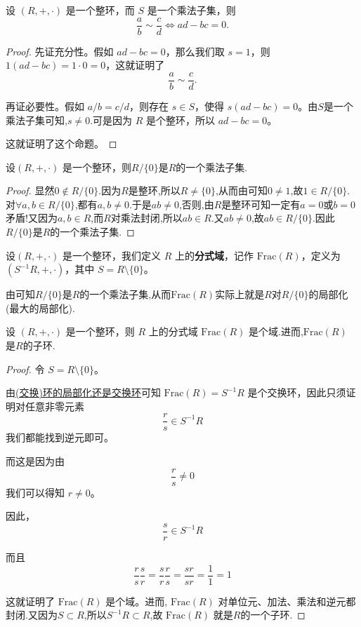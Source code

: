 \documentclass[../../main.tex]{subfiles}
\begin{document}
\begin{proposition}\label{proposition整环的局部化中两个元素等价的充要条件}
设 $(R, +, \cdot)$ 是一个整环，而 $S$ 是一个乘法子集，则
\[\frac{a}{b} \sim \frac{c}{d} \iff ad - bc = 0 .\]
\end{proposition}
\begin{proof}
先证充分性。假如 $ad - bc = 0$，那么我们取 $s = 1$，则 $1(ad - bc) = 1 \cdot 0 = 0$，这就证明了
\[\frac{a}{b} \sim \frac{c}{d} .\]

再证必要性。假如 $a/b = c/d$，则存在 $s \in S$，使得 $s(ad - bc) = 0$。由$S$是一个乘法子集可知,$s \neq 0$.可是因为 $R$ 是个整环，所以 $ad - bc = 0$。

这就证明了这个命题。
\end{proof}

\begin{proposition}\label{proposition:R/0一定是整环R的乘法子集}
设$(R, +, \cdot)$ 是一个整环，则$R/\{0\}$是$R$的一个乘法子集.
\end{proposition}
\begin{proof}
显然$0\notin R/\{0\}$.因为$R$是整环,所以$R\ne \{0\}$,从而由可知$0\ne 1$,故$1\in R/\{0\}.$对$\forall a,b\in R/\{0\}$,都有$a,b\ne 0.$于是$ab\ne 0$,否则,由$R$是整环可知一定有$a=0$或$b=0$矛盾!又因为$a,b\in R$,而$R$对乘法封闭,所以$ab\in R$.又$ab\ne 0$,故$ab\in R/\{0\}.$因此$R/\{0\}$是$R$的一个乘法子集.
\end{proof}

\begin{definition}[分式域]
设$(R, +, \cdot)$ 是一个整环，我们定义 $R$ 上的\textbf{分式域}，记作 $\mathrm{Frac}(R)$，定义为 $(S^{-1}R,+,\cdot)$，其中 $S = R \setminus \{0\}$。
\end{definition}
\begin{note}
由可知$R/\{0\}$是$R$的一个乘法子集,从而$\mathrm{Frac}(R)$实际上就是$R$对$R/\{0\}$的局部化(最大的局部化).
\end{note}

\begin{proposition}[分式域是域]
设 $(R, +, \cdot)$ 是一个整环，则 $R$ 上的分式域 $\mathrm{Frac}(R)$ 是个域.进而,$\mathrm{Frac}(R)$ 是$R$的子环.
\end{proposition}
\begin{proof}
令 $S = R \setminus \{0\}$。

由\hyperref[proposition:(交换)环的局部化还是交换环]{(交换)环的局部化还是交换环}可知   $\mathrm{Frac}(R) = S^{-1}R$ 是个交换环，因此只须证明对任意非零元素
\[\frac{r}{s} \in S^{-1}R\]
我们都能找到逆元即可。

而这是因为由
\[\frac{r}{s} \neq 0\]
我们可以得知 $r \neq 0$。

因此，
\[\frac{s}{r} \in S^{-1}R\]

而且
\[\frac{r}{s}\frac{s}{r} = \frac{s}{r}\frac{r}{s} = \frac{sr}{sr} = \frac{1}{1} = 1\]

这就证明了 $\mathrm{Frac}(R)$ 是个域。进而, $\mathrm{Frac}(R)$ 对单位元、加法、乘法和逆元都封闭.又因为$S\subset R$,所以$S^{-1}R\subset R$,故 $\mathrm{Frac}(R)$ 就是$R$的一个子环.
\end{proof}
\end{document}
